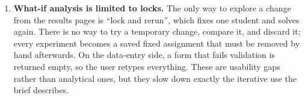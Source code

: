\documentclass[11pt,a4paper]{article}
\begin{document}
\begin{enumerate}
        bands and the one-sentence headline on the solution page compress
        the indicators into words. The thresholds were set by eye on the
        demo cohorts, and a headline that counts first and second choices
        says nothing about third choices. Both are meant to orient the
        reader, who still has to look at the figures and the named students
        below them.
  \item \textbf{What-if analysis is limited to locks.} The only way to
        explore a change from the results pages is ``lock and rerun'', which
        fixes one student and solves again. There is no way to try a
        temporary change, compare it, and discard it; every experiment
        becomes a saved fixed assignment that must be removed by hand
        afterwards. On the data-entry side, a form that fails validation is
        returned empty, so the user retypes everything. These are usability
        gaps rather than analytical ones, but they slow down exactly the
        iterative use the brief describes.
\end{enumerate}
\end{document}
